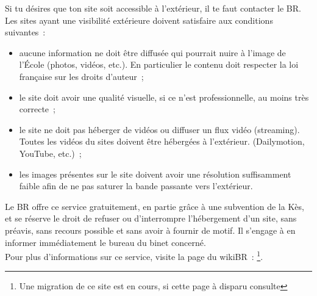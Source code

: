 Si tu désires que ton site soit accessible à l'extérieur, il te faut contacter le BR. Les sites ayant une visibilité extérieure doivent satisfaire aux conditions suivantes~:
\begin{itemize}
    \item aucune information ne doit être diffusée qui pourrait nuire à l'image de l'École (photos, vidéos, etc.). En particulier le contenu doit respecter la loi française sur les droits d'auteur~;
    \item le site doit avoir une qualité visuelle, si ce n'est professionnelle, au moins très correcte~;
    \item le site ne doit pas héberger de vidéos ou diffuser un flux vidéo (streaming). Toutes les vidéos du sites doivent être hébergées à l'extérieur. (Dailymotion, YouTube, etc.)~;
    \item les images présentes sur le site doivent avoir une résolution suffisamment faible afin de ne pas saturer la bande passante vers l'extérieur.
\end{itemize}

Le BR offre ce service gratuitement, en partie grâce à une subvention de la Kès, et se réserve le droit de refuser ou d'interrompre l'hébergement d'un site, sans préavis, sans recours possible et sans avoir à fournir de motif.
Il s'engage à en informer immédiatement le bureau du binet concerné.\\
Pour plus d'informations sur ce service, visite la page du wikiBR~: \newline {}\footnote{Une migration de ce site est en cours, si cette page à disparu consulte }.
